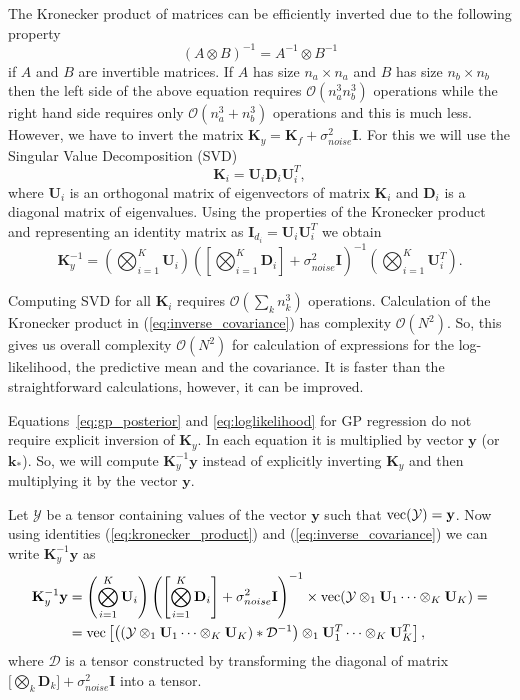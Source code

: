 The Kronecker product of matrices can be efficiently inverted due to the following
property
\[
(A \otimes B)^{-1} = A^{-1} \otimes B^{-1}
\]
if $A$ and $B$ are invertible matrices.
If $A$ has size $n_a \times n_a$ and $B$ has size $n_b \times n_b$ then
the left side of the above equation requires $\mathcal{O}(n_a^3n_b^3)$ operations
while the right hand side requires only $\mathcal{O}(n_a^3 + n_b^3)$ operations
and this is much less.
However, we have to invert the matrix $\mathbf{K}_y = \mathbf{K}_f + \sigma_{noise}^2 \mathbf{I}$.
For this we will use the Singular Value Decomposition (SVD)
\[
\mathbf{K}_i = \mathbf{U}_i \mathbf{D}_i \mathbf{U}_i^T,
\]
where $\mathbf{U}_i$ is an orthogonal matrix of eigenvectors of matrix $\mathbf{K}_i$
and $\mathbf{D}_i$ is a diagonal matrix of eigenvalues.
Using the properties of the Kronecker product and representing an identity matrix as
$\mathbf{I}_{d_i} = \mathbf{U}_i \mathbf{U}_i^T$ we obtain
\begin{equation}
  \label{eq:inverse_covariance}
  \mathbf{K}_y^{-1} = \left (\bigotimes_{i = 1}^K \mathbf{U}_i \right ) \left (
    \left [\bigotimes_{i = 1}^K \mathbf{D}_i \right ] + \sigma_{noise}^2 \mathbf{I} \right )^{-1}
  \left ( \bigotimes_{i = 1}^K \mathbf{U}_i^T \right ).
\end{equation}

Computing SVD for all $\mathbf{K}_i$ requires $\mathcal{O}(\sum_k n_k^3)$ operations.
Calculation of the Kronecker product in (\ref{eq:inverse_covariance}) has complexity $\mathcal{O}(N^2)$.
So, this gives us overall complexity $\mathcal{O}(N^2)$ for calculation of expressions for the log-likelihood,
the predictive mean and the covariance.
It is faster than the straightforward calculations, however, it can be improved.

Equations~\eqref{eq:gp_posterior} and \eqref{eq:loglikelihood}
for GP regression do not require explicit inversion of $\mathbf{K}_y$.
In each equation it is multiplied by vector $\mathbf{y}$ (or $\mathbf{k}_*$).
So, we will compute $\mathbf{K}_y^{-1} \mathbf{y}$ instead of explicitly inverting
$\mathbf{K}_y$ and then multiplying it by the vector $\mathbf{y}$.

Let $\mathcal{Y}$ be a tensor containing values of the vector $\mathbf{y}$ such that
${\rm vec}(\mathcal{Y}) = \mathbf{y}$.
Now using identities (\ref{eq:kronecker_product}) and (\ref{eq:inverse_covariance})
we can write $\mathbf{K}_y^{-1}\mathbf{y}$ as
\begin{align}
  \label{eq:fast_inverse_covariance}
    \mathbf{K}_y^{-1}\mathbf{y} &= \left ( \bigotimes_{i = 1}^K \mathbf{U}_i \right )
    \left ( \left [\bigotimes_{i = 1}^K \mathbf{D}_i \right ] + \sigma_{noise}^2 \mathbf{I} \right )^{-1} \times
    {\rm vec}(\mathcal{Y} \otimes_1 \mathbf{U}_1 \cdots \otimes_K \mathbf{U}_K) = \nonumber \\
    &= {\rm vec}\left [ \left ((\mathcal{Y} \otimes_1 \mathbf{U}_1 \cdots \otimes_K \mathbf{U}_K) * \mathcal{D}^{-1} \right ) \otimes_1
    \mathbf{U}_1^T \cdots \otimes_K \mathbf{U}_K^T \right ],
\end{align}
where $\mathcal{D}$ is a tensor constructed by transforming the diagonal of matrix
$\big [\bigotimes_k \mathbf{D}_k \big ] + \sigma_{noise}^2 \mathbf{I}$ into a tensor.

